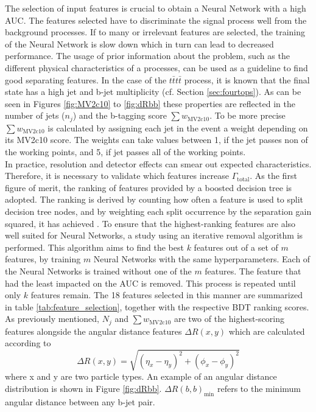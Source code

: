 The selection of input features is crucial to obtain a Neural Network with a high AUC. The features selected have to discriminate the signal process well from the background processes. If to many or irrelevant features are selected, the training of the Neural Network is slow down which in turn can lead to decreased performance. The usage of prior information about the problem, such as the different physical characteristics of a processes, can be used as a guideline to find good separating features. In the case of the $t\bar{t}t\bar{t}$ process,
it is known that the final state has a high jet and b-jet multiplicity (cf. Section \ref{sec:fourtops}). As can be seen in Figures \ref{fig:MV2c10} to \ref{fig:dRbb} these properties are reflected in the number of jets ($n_{j}$) and the b-tagging score $\sum w_{\text{MV2c10}}$. To be more precise $\sum w_{\text{MV2c10}}$ is calculated by assigning each jet in the event a weight depending on its MV2c10 score. The weights can take values between 1, if the jet passes non of the working points, and 5, if jet passes all of the working points. \\
In practice, resolution and detector effects can smear out expected characteristics. Therefore, it is necessary to validate which features increase $\Gamma_{\text{total}}$. As the first figure of merit, the ranking of features provided by a boosted decision tree \cite{BDT} is adopted. The ranking is derived by counting how often a feature is used to split decision tree nodes, and by weighting each split occurrence by the separation gain squared, it has achieved \cite{TMVA}. To ensure that the highest-ranking features are also well suited for Neural Networks, a study using an iterative removal algorithm is performed. This algorithm aims to find the best $k$ features out of a set of $m$ features, by training $m$ Neural Networks with the same hyperparameters. Each of the Neural Networks is trained without one of the $m$ features. The feature that had the least impacted on the AUC is removed. This process is repeated until only $k$ features remain.
The 18 features selected in this manner are summarized in table \ref{tab:feature_selection}, together with the respective BDT ranking scores. As previously mentioned, $N_j$ and $\sum w_{\text{MV2c10}}$ are two of the highest-scoring features alongside the angular distance features $\Delta R(x,y)$ which are calculated according to
\begin{equation}
\Delta R(x,y) = \sqrt{(\eta_x - \eta_y)^2 + (\phi_x - \phi_y)^2}
\end{equation}
where x and y are two particle types. An example of an angular distance distribution is shown in Figure \ref{fig:dRbb}. $\Delta R(b,b)_{\text{min}}$ refers to the minimum angular distance between any b-jet pair. \\

